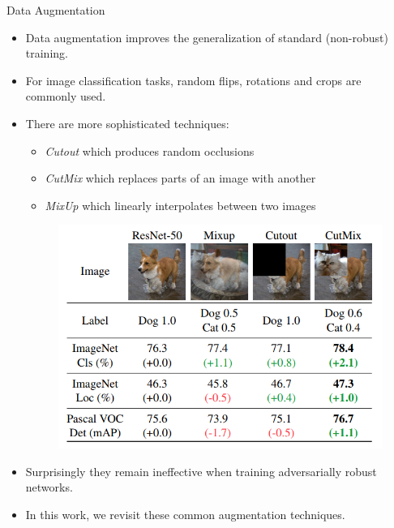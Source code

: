 \begin{frame}{Data Augmentation}
    \begin{itemize}[<+-| alert@+>] %
        \item Data augmentation improves the generalization of standard (non-robust) training. 
        \item For image classification tasks, random flips, rotations and crops are commonly used. 
        \item There are more sophisticated techniques: 
            \begin{itemize}
                \item \textit{Cutout} which produces random occlusions
                \item \textit{CutMix} which replaces parts of an image with another
                \item \textit{MixUp} which linearly interpolates between two images
            \end{itemize}
        \begin{figure}
            \centering
            \includegraphics[width=0.5\linewidth]{pic/cutmix.png}
            \label{fig:cutmix}
        \end{figure}
        \item Surprisingly they remain ineffective when training adversarially robust networks. 
        \item In this work, we revisit these common augmentation techniques.
    \end{itemize}
\end{frame}

